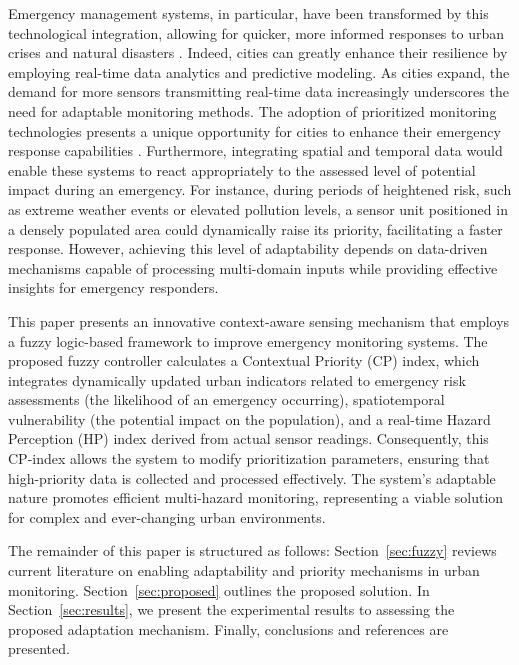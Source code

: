 \documentclass[conference]{IEEEtran}
\begin{document}
Emergency management systems, in particular, have been transformed by this technological integration, allowing for quicker, more informed responses to urban crises and natural disasters \cite{costaSurveyEmergenciesManagement2022}. Indeed, cities can greatly enhance their resilience by employing real-time data analytics and predictive modeling. As cities expand, the demand for more sensors transmitting real-time data increasingly underscores the need for adaptable monitoring methods.
%
The adoption of prioritized monitoring technologies presents a unique opportunity for cities to enhance their emergency response capabilities \cite{pognonAdaptivePriorityScheduling2024}. Furthermore, integrating spatial and temporal data would enable these systems to react appropriately to the assessed level of potential impact during an emergency. For instance, during periods of heightened risk, such as extreme weather events or elevated pollution levels, a sensor unit positioned in a densely populated area could dynamically raise its priority, facilitating a faster response. However, achieving this level of adaptability depends on data-driven mechanisms capable of processing multi-domain inputs while providing effective insights for emergency responders.  

This paper presents an innovative context-aware sensing mechanism that employs a fuzzy logic-based framework to improve emergency monitoring systems. The proposed fuzzy controller calculates a Contextual Priority (CP) index, which integrates dynamically updated urban indicators related to emergency risk assessments (the likelihood of an emergency occurring), spatiotemporal vulnerability (the potential impact on the population), and a real-time Hazard Perception (HP) index derived from actual sensor readings. Consequently, this CP-index allows the system to modify prioritization parameters, ensuring that high-priority data is collected and processed effectively. The system's adaptable nature promotes efficient multi-hazard monitoring, representing a viable solution for complex and ever-changing urban environments.


The remainder of this paper is structured as follows: Section~\ref{sec:fuzzy} reviews current literature on enabling adaptability and priority mechanisms in urban monitoring. Section~\ref{sec:proposed} outlines the proposed solution. In Section~\ref{sec:results}, we present the experimental results to assessing the proposed adaptation mechanism. Finally, conclusions and references are presented.
\end{document}
